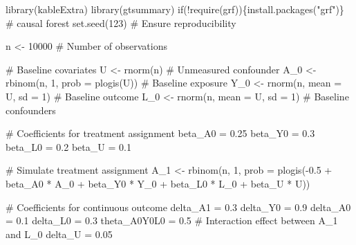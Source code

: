 \documentclass[
  singlecolumn]{article}
\newenvironment{Shaded}{\begin{snugshade}}{\end{snugshade}}
\newcommand{\AttributeTok}[1]{\textcolor[rgb]{0.40,0.45,0.13}{#1}}
\newcommand{\CommentTok}[1]{\textcolor[rgb]{0.37,0.37,0.37}{#1}}
\newcommand{\ControlFlowTok}[1]{\textcolor[rgb]{0.00,0.23,0.31}{#1}}
\newcommand{\DecValTok}[1]{\textcolor[rgb]{0.68,0.00,0.00}{#1}}
\newcommand{\FloatTok}[1]{\textcolor[rgb]{0.68,0.00,0.00}{#1}}
\newcommand{\FunctionTok}[1]{\textcolor[rgb]{0.28,0.35,0.67}{#1}}
\newcommand{\NormalTok}[1]{\textcolor[rgb]{0.00,0.23,0.31}{#1}}
\newcommand{\OtherTok}[1]{\textcolor[rgb]{0.00,0.23,0.31}{#1}}
\newcommand{\SpecialCharTok}[1]{\textcolor[rgb]{0.37,0.37,0.37}{#1}}
\newcommand{\StringTok}[1]{\textcolor[rgb]{0.13,0.47,0.30}{#1}}
\begin{document}
\begin{Shaded}
\begin{Highlighting}[]
\FunctionTok{library}\NormalTok{(kableExtra)}
\FunctionTok{library}\NormalTok{(gtsummary)}
\ControlFlowTok{if}\NormalTok{(}\SpecialCharTok{!}\FunctionTok{require}\NormalTok{(grf))\{}\FunctionTok{install.packages}\NormalTok{(}\StringTok{"grf"}\NormalTok{)\} }\CommentTok{\# causal forest}
\FunctionTok{set.seed}\NormalTok{(}\DecValTok{123}\NormalTok{) }\CommentTok{\# Ensure reproducibility}

\NormalTok{n }\OtherTok{\textless{}{-}} \DecValTok{10000} \CommentTok{\# Number of observations}

\CommentTok{\# Baseline covariates}
\NormalTok{U }\OtherTok{\textless{}{-}} \FunctionTok{rnorm}\NormalTok{(n) }\CommentTok{\# Unmeasured confounder}
\NormalTok{A\_0 }\OtherTok{\textless{}{-}} \FunctionTok{rbinom}\NormalTok{(n, }\DecValTok{1}\NormalTok{, }\AttributeTok{prob =} \FunctionTok{plogis}\NormalTok{(U)) }\CommentTok{\# Baseline exposure}
\NormalTok{Y\_0 }\OtherTok{\textless{}{-}} \FunctionTok{rnorm}\NormalTok{(n, }\AttributeTok{mean =}\NormalTok{ U, }\AttributeTok{sd =} \DecValTok{1}\NormalTok{) }\CommentTok{\# Baseline outcome}
\NormalTok{L\_0 }\OtherTok{\textless{}{-}} \FunctionTok{rnorm}\NormalTok{(n, }\AttributeTok{mean =}\NormalTok{ U, }\AttributeTok{sd =} \DecValTok{1}\NormalTok{) }\CommentTok{\# Baseline confounders}

\CommentTok{\# Coefficients for treatment assignment}
\NormalTok{beta\_A0 }\OtherTok{=} \FloatTok{0.25}
\NormalTok{beta\_Y0 }\OtherTok{=} \FloatTok{0.3}
\NormalTok{beta\_L0 }\OtherTok{=} \FloatTok{0.2}
\NormalTok{beta\_U }\OtherTok{=} \FloatTok{0.1}

\CommentTok{\# Simulate treatment assignment}
\NormalTok{A\_1 }\OtherTok{\textless{}{-}} \FunctionTok{rbinom}\NormalTok{(n, }\DecValTok{1}\NormalTok{, }\AttributeTok{prob =} \FunctionTok{plogis}\NormalTok{(}\SpecialCharTok{{-}}\FloatTok{0.5} \SpecialCharTok{+} 
\NormalTok{                                    beta\_A0 }\SpecialCharTok{*}\NormalTok{ A\_0 }\SpecialCharTok{+}
\NormalTok{                                    beta\_Y0 }\SpecialCharTok{*}\NormalTok{ Y\_0 }\SpecialCharTok{+} 
\NormalTok{                                    beta\_L0 }\SpecialCharTok{*}\NormalTok{ L\_0 }\SpecialCharTok{+} 
\NormalTok{                                    beta\_U }\SpecialCharTok{*}\NormalTok{ U))}

\CommentTok{\# Coefficients for continuous outcome}
\NormalTok{delta\_A1 }\OtherTok{=} \FloatTok{0.3}
\NormalTok{delta\_Y0 }\OtherTok{=} \FloatTok{0.9}
\NormalTok{delta\_A0 }\OtherTok{=} \FloatTok{0.1}
\NormalTok{delta\_L0 }\OtherTok{=} \FloatTok{0.3}
\NormalTok{theta\_A0Y0L0 }\OtherTok{=} \FloatTok{0.5} \CommentTok{\# Interaction effect between A\_1 and L\_0}
\NormalTok{delta\_U }\OtherTok{=} \FloatTok{0.05}


\end{Highlighting}
\end{Shaded}
\end{document}
